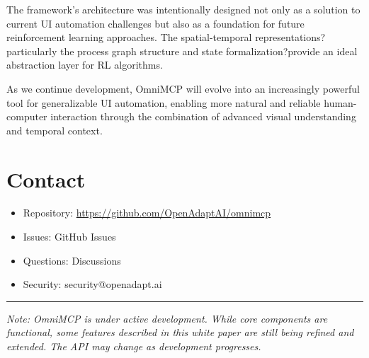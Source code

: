 \documentclass{article}
\begin{document}
The framework's architecture was intentionally designed not only as a solution to current UI automation challenges but also as a foundation for future reinforcement learning approaches. The spatial-temporal representations?particularly the process graph structure and state formalization?provide an ideal abstraction layer for RL algorithms. 

As we continue development, OmniMCP will evolve into an increasingly powerful tool for generalizable UI automation, enabling more natural and reliable human-computer interaction through the combination of advanced visual understanding and temporal context.

\section{Contact}

\begin{itemize}
    \item Repository: \url{https://github.com/OpenAdaptAI/omnimcp}
    \item Issues: GitHub Issues
    \item Questions: Discussions
    \item Security: security@openadapt.ai
\end{itemize}

\vspace{0.5cm}
\noindent\rule{\textwidth}{0.4pt}

\noindent\textit{Note: OmniMCP is under active development. While core components are functional, some features described in this white paper are still being refined and extended. The API may change as development progresses.}
\end{document}
